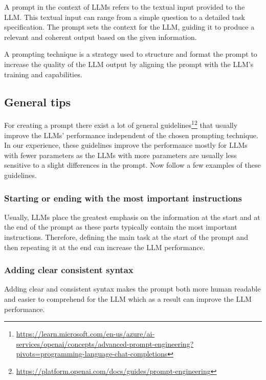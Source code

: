 A prompt in the context of LLMs refers to the textual input provided to the LLM. This textual input can range from a simple question to a detailed task specification. The prompt sets the context for the LLM, guiding it to produce a relevant and coherent output based on the given information.

A prompting technique is a strategy used to structure and format the prompt to increase the quality of the LLM output by aligning the prompt with the LLM's training and capabilities.


\subsection{General tips}
\label{prompt_general_tips}

For creating a prompt there exist a lot of general guidelines\footnote{\url{https://learn.microsoft.com/en-us/azure/ai-services/openai/concepts/advanced-prompt-engineering?pivots=programming-language-chat-completions}}\footnote{\url{https://platform.openai.com/docs/guides/prompt-engineering}} that usually improve the LLMs' performance independent of the chosen prompting technique. In our experience, these guidelines improve the performance mostly for LLMs with fewer parameters as the LLMs with more parameters are usually less sensitive to a slight differences in the prompt. Now follow a few examples of these guidelines.


\subsubsection{Starting or ending with the most important instructions}

Usually, LLMs place the greatest emphasis on the information at the start and at the end of the prompt as these parts typically contain the most important instructions. Therefore, defining the main task at the start of the prompt and then repeating it at the end can increase the LLM performance.


\subsubsection{Adding clear consistent syntax}

Adding clear and consistent syntax makes the prompt both more human readable and easier to comprehend for the LLM which as a result can improve the LLM performance.




